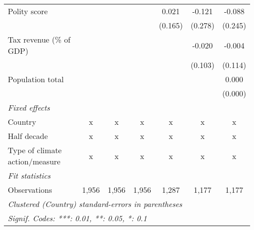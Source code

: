 \begin{tabular}{lcccccc}
   Polity score                                                           &         &         &              & 0.021         & -0.121         & -0.088\\   
                                                                          &         &         &              & (0.165)       & (0.278)        & (0.245)\\   
   Tax revenue (\% of GDP)                                                &         &         &              &               & -0.020         & -0.004\\   
                                                                          &         &         &              &               & (0.103)        & (0.114)\\   
   Population total                                                       &         &         &              &               &                & 0.000\\   
                                                                          &         &         &              &               &                & (0.000)\\   
   \emph{Fixed effects}\\
   Country                                                                & x       & x       & x            & x             & x              & x\\  
   Half decade                                                            & x       & x       & x            & x             & x              & x\\  
   Type of climate action/measure                                         & x       & x       & x            & x             & x              & x\\  
   \midrule \emph{Fit statistics}\\
   Observations                                                           & 1,956   & 1,956   & 1,956        & 1,287         & 1,177          & 1,177\\  
   \midrule
   \multicolumn{7}{l}{\emph{Clustered (Country) standard-errors in parentheses}}\\
   \multicolumn{7}{l}{\emph{Signif. Codes: ***: 0.01, **: 0.05, *: 0.1}}\\
\end{tabular}
\par\endgroup


